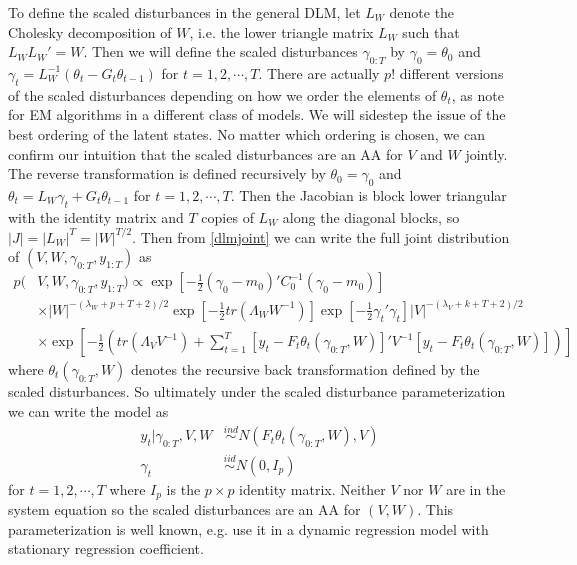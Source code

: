 \documentclass{article}
\begin{document}
To define the scaled disturbances in the general DLM, let $L_W$ denote the Cholesky decomposition of $W$, i.e. the lower triangle matrix $L_W$ such that $L_WL_W' =W$. Then we will define the scaled disturbances $\gamma_{0:T}$ by $\gamma_0=\theta_0$ and $\gamma_t = L_W^{-1}(\theta_t-G_t\theta_{t-1})$ for $t=1,2,\cdots,T$. There are actually $p!$ different versions of the scaled disturbances depending on how we order the elements of $\theta_t$, as \citet{meng1998fast} note for EM algorithms in a different class of models. We will sidestep the issue of the best ordering of the latent states. No matter which ordering is chosen, we can confirm our intuition that the scaled disturbances are an AA for $V$ and $W$ jointly. The reverse transformation is defined recursively by $\theta_0=\gamma_0$ and $\theta_t=L_W\gamma_t + G_t\theta_{t-1}$ for $t=1,2,\cdots,T$. Then the Jacobian is block lower triangular with the identity matrix and $T$ copies of $L_W$ along the diagonal blocks, so $|J| = |L_W|^T=|W|^{T/2}$. Then from \eqref{dlmjoint} we can write the full joint distribution of $(V,W,\gamma_{0:T},y_{1:T})$ as
 \begin{align}
  p(&V,W,\gamma_{0:T},y_{1:T}) \propto \exp\left[-\frac{1}{2}(\gamma_0-m_0)'C_0^{-1}(\gamma_0-m_0)\right] \nonumber\\
  &\times |W|^{-(\lambda_W + p + T + 2)/2}\exp\left[-\frac{1}{2}tr\left(\Lambda_WW^{-1}\right)\right] \exp\left[-\frac{1}{2}\gamma_t'\gamma_t\right] |V|^{-(\lambda_V + k + T + 2)/2} \nonumber\\
  &\times \exp\left[-\frac{1}{2}\left(tr\left(\Lambda_VV^{-1}\right) + \sum_{t=1}^T\left[y_t-F_t\theta_t(\gamma_{0:T},W)\right]'V^{-1}\left[y_t-F_t\theta_t(\gamma_{0:T},W)\right]\right)\right] \label{dlmdistjoint}
 \end{align}
where $\theta_t(\gamma_{0:T},W)$ denotes the recursive back transformation defined by the scaled disturbances. So ultimately under the scaled disturbance parameterization we can write the model as
\begin{align}
  y_t|\gamma_{0:T},V,W & \stackrel{ind}{\sim} N\left(F_t\theta_t(\gamma_{0:T},W), V\right)\nonumber\\
  \gamma_t & \stackrel{iid}{\sim}N(0,I_p) \label{dlmdistmodel}
\end{align}
for $t=1,2,\cdots,T$ where $I_p$ is the $p\times p$ identity matrix. Neither $V$ nor $W$ are in the system equation so the scaled disturbances are an AA for $(V,W)$. This parameterization is well known, e.g. \citet{fruhwirth2004efficient} use it in a dynamic regression model with stationary regression coefficient. 
\end{document}
